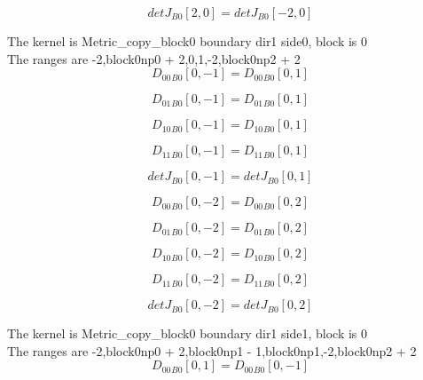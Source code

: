 \documentclass{article}
\begin{document}
\begin{dmath}{detJ{_{B0}}}[{2,0}] = {detJ{_{B0}}}[{-2,0}]\end{dmath}

\noindent The kernel is Metric_copy_block0 boundary dir1 side0, block is 0\\\noindent The ranges are -2,block0np0 + 2,0,1,-2,block0np2 + 2\\\begin{dmath}{D_{00}{_{B0}}}[{0,-1}] = {D_{00}{_{B0}}}[{0,1}]\end{dmath}

\begin{dmath}{D_{01}{_{B0}}}[{0,-1}] = {D_{01}{_{B0}}}[{0,1}]\end{dmath}

\begin{dmath}{D_{10}{_{B0}}}[{0,-1}] = {D_{10}{_{B0}}}[{0,1}]\end{dmath}

\begin{dmath}{D_{11}{_{B0}}}[{0,-1}] = {D_{11}{_{B0}}}[{0,1}]\end{dmath}

\begin{dmath}{detJ{_{B0}}}[{0,-1}] = {detJ{_{B0}}}[{0,1}]\end{dmath}

\begin{dmath}{D_{00}{_{B0}}}[{0,-2}] = {D_{00}{_{B0}}}[{0,2}]\end{dmath}

\begin{dmath}{D_{01}{_{B0}}}[{0,-2}] = {D_{01}{_{B0}}}[{0,2}]\end{dmath}

\begin{dmath}{D_{10}{_{B0}}}[{0,-2}] = {D_{10}{_{B0}}}[{0,2}]\end{dmath}

\begin{dmath}{D_{11}{_{B0}}}[{0,-2}] = {D_{11}{_{B0}}}[{0,2}]\end{dmath}

\begin{dmath}{detJ{_{B0}}}[{0,-2}] = {detJ{_{B0}}}[{0,2}]\end{dmath}

\noindent The kernel is Metric_copy_block0 boundary dir1 side1, block is 0\\\noindent The ranges are -2,block0np0 + 2,block0np1 - 1,block0np1,-2,block0np2 + 2\\\begin{dmath}{D_{00}{_{B0}}}[{0,1}] = {D_{00}{_{B0}}}[{0,-1}]\end{dmath}
\end{document}
